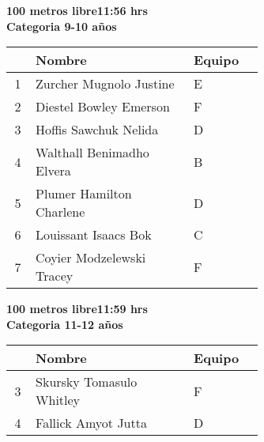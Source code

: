\begin{minipage}{0.95\linewidth}\vspace{0.5cm} 
\begin{flushleft}
\textbf{
\hspace{-0.15cm}100 metros libre\hspace{1.5cm}11:56 hrs \\Categoria 9-10 años}\vspace{-0.2cm} 
\end{flushleft}
\begin{tabular}{cp{0.63\linewidth}l}
\hline
& \textbf{Nombre} & \textbf{Equipo} \\ \hline
1 & Zurcher Mugnolo Justine & E \\ 
2 & Diestel Bowley Emerson & F \\ 
3 & Hoffis Sawchuk Nelida & D \\ 
4 & Walthall Benimadho Elvera & B \\ 
5 & Plumer Hamilton Charlene & D \\ 
6 & Louissant Isaacs Bok & C \\ 
7 & Coyier Modzelewski Tracey & F \\ 
\end{tabular}
\end{minipage}
\begin{minipage}{0.95\linewidth}\vspace{0.5cm} 
\begin{flushleft}
\textbf{
\hspace{-0.15cm}100 metros libre\hspace{1.5cm}11:59 hrs \\Categoria 11-12 años}\vspace{-0.2cm} 
\end{flushleft}
\begin{tabular}{cp{0.63\linewidth}l}
\hline
& \textbf{Nombre} & \textbf{Equipo} \\ \hline
3 & Skursky Tomasulo Whitley & F \\ 
4 & Fallick Amyot Jutta & D \\ 
\end{tabular}
\end{minipage}
